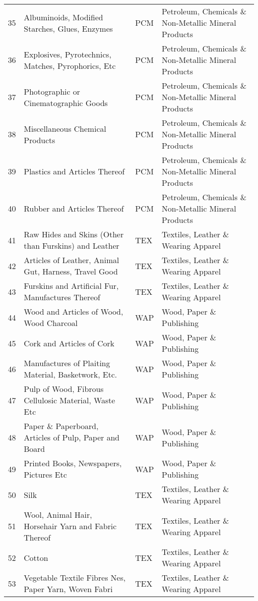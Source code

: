 \documentclass[a4paper]{article}
\begin{document}
\begin{table}[ht]
{\begin{tabular}{rlll}
  35 & Albuminoids, Modified Starches, Glues, Enzymes & PCM & Petroleum, Chemicals \& Non-Metallic Mineral Products \\ 
  36 & Explosives, Pyrotechnics, Matches, Pyrophorics, Etc & PCM & Petroleum, Chemicals \& Non-Metallic Mineral Products \\ 
  37 & Photographic or Cinematographic Goods & PCM & Petroleum, Chemicals \& Non-Metallic Mineral Products \\ 
  38 & Miscellaneous Chemical Products & PCM & Petroleum, Chemicals \& Non-Metallic Mineral Products \\ 
  39 & Plastics and Articles Thereof & PCM & Petroleum, Chemicals \& Non-Metallic Mineral Products \\ 
  40 & Rubber and Articles Thereof & PCM & Petroleum, Chemicals \& Non-Metallic Mineral Products \\ 
  41 & Raw Hides and Skins (Other than Furskins) and Leather & TEX & Textiles, Leather \& Wearing Apparel \\ 
  42 & Articles of Leather, Animal Gut, Harness, Travel Good & TEX & Textiles, Leather \& Wearing Apparel \\ 
  43 & Furskins and Artificial Fur, Manufactures Thereof & TEX & Textiles, Leather \& Wearing Apparel \\ 
  44 & Wood and Articles of Wood, Wood Charcoal & WAP & Wood, Paper \& Publishing \\ 
  45 & Cork and Articles of Cork & WAP & Wood, Paper \& Publishing \\ 
  46 & Manufactures of Plaiting Material, Basketwork, Etc. & WAP & Wood, Paper \& Publishing \\ 
  47 & Pulp of Wood, Fibrous Cellulosic Material, Waste Etc & WAP & Wood, Paper \& Publishing \\ 
  48 & Paper \& Paperboard, Articles of Pulp, Paper and Board & WAP & Wood, Paper \& Publishing \\ 
  49 & Printed Books, Newspapers, Pictures Etc & WAP & Wood, Paper \& Publishing \\ 
  50 & Silk & TEX & Textiles, Leather \& Wearing Apparel \\ 
  51 & Wool, Animal Hair, Horsehair Yarn and Fabric Thereof & TEX & Textiles, Leather \& Wearing Apparel \\ 
  52 & Cotton & TEX & Textiles, Leather \& Wearing Apparel \\ 
  53 & Vegetable Textile Fibres Nes, Paper Yarn, Woven Fabri & TEX & Textiles, Leather \& Wearing Apparel \\ 

\end{tabular}}
\end{table}
\end{document}
